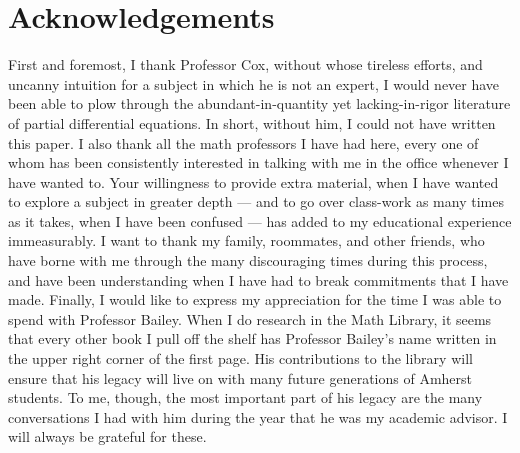 \documentclass[11 pt]{report}
\begin{document}
\chapter*{Acknowledgements}

First and foremost, I thank Professor Cox, without whose tireless efforts, and uncanny intuition for a subject in which he is not an expert, I would never have been able to plow through the abundant-in-quantity yet lacking-in-rigor literature of partial differential equations.  In short, without him, I could not have written this paper.  I also thank all the math professors I have had here, every one of whom has been consistently interested in talking with me in the office whenever I have wanted to.  Your willingness to provide extra material, when I have wanted to explore a subject in greater depth --- and to go over class-work as many times as it takes, when I have been confused --- has added to my educational experience immeasurably.  I want to thank my family, roommates, and other friends, who have borne with me through the many discouraging times during this process, and have been understanding when I have had to break commitments that I have made.  Finally, I would like to express my appreciation for the time I was able to spend with Professor Bailey.  When I do research in the Math Library, it seems that every other book I pull off the shelf has Professor Bailey's name written in the upper right corner of the first page.  His contributions to the library will ensure that his legacy will live on with many future generations of Amherst students.  To me, though, the most important part of his legacy are the many conversations I had with him during the year that he was my academic advisor.  I will always be grateful for these.

\tableofcontents
\newpage



\setcounter{chapter}{-1}









\end{document}
